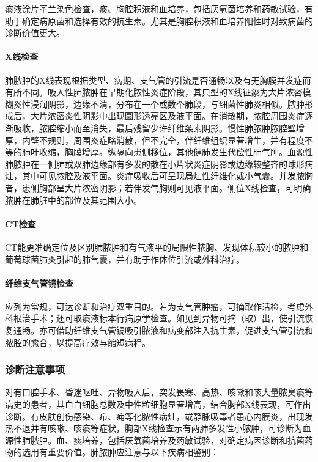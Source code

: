 痰液涂片革兰染色检查，痰、胸腔积液和血培养，包括厌氧菌培养和药敏试验，有助于确定病原菌和选择有效的抗生素。尤其是胸腔积液和血培养阳性时对致病菌的诊断价值更大。

\paragraph{X线检查}

肺脓肿的X线表现根据类型、病期、支气管的引流是否通畅以及有无胸膜并发症而有所不同。吸入性肺脓肿在早期化脓性炎症阶段，其典型的X线征象为大片浓密模糊炎性浸润阴影，边缘不清，分布在一个或数个肺段，与细菌性肺炎相似。脓肿形成后，大片浓密炎性阴影中出现圆形透亮区及液平面。在消散期，脓腔周围炎症逐渐吸收，脓腔缩小而至消失，最后残留少许纤维条索阴影。慢性肺脓肿脓腔壁增厚，内壁不规则，周围炎症略消散，但不完全，伴纤维组织显著增生，并有程度不等的肺叶收缩，胸膜增厚。纵隔向患侧移位，其他健肺发生代偿性肺气肿。血源性肺脓肿在一侧肺或双肺边缘部有多发的散在小片状炎症阴影或边缘较整齐的球形病灶，其中可见脓腔及液平面。炎症吸收后可呈现局灶性纤维化或小气囊。并发脓胸者，患侧胸部呈大片浓密阴影；若伴发气胸则可见液平面。侧位X线检查，可明确脓肿在肺脏中的部位及其范围大小。

\paragraph{CT检查}

CT能更准确定位及区别肺脓肿和有气液平的局限性脓胸、发现体积较小的脓肿和葡萄球菌肺炎引起的肺气囊，并有助于作体位引流或外科治疗。

\paragraph{纤维支气管镜检查}

应列为常规，可达诊断和治疗双重目的。若为支气管肿瘤，可摘取作活检，考虑外科根治手术；还可取痰液标本行病原学检查。如见到异物可摘（取）出，使引流恢复通畅。亦可借助纤维支气管镜吸引脓液和病变部注入抗生素，促进支气管引流和脓腔的愈合，以提高疗效与缩短病程。

\subsubsection{诊断注意事项}

对有口腔手术、昏迷呕吐、异物吸入后，突发畏寒、高热、咳嗽和咳大量脓臭痰等病史的患者，其血白细胞总数及中性粒细胞显著增高，结合胸部X线表现，可作出诊断。有皮肤创伤感染、疖、痈等化脓性病灶，或静脉吸毒者患心内膜炎，出现发热不退并有咳嗽、咳痰等症状，胸部X线检查示有两肺多发性小脓肿，可诊断为血源性肺脓肿。血、痰培养，包括厌氧菌培养及药敏试验，对确定病因诊断和抗菌药物的选用有重要价值。肺脓肿应注意与以下疾病相鉴别：

